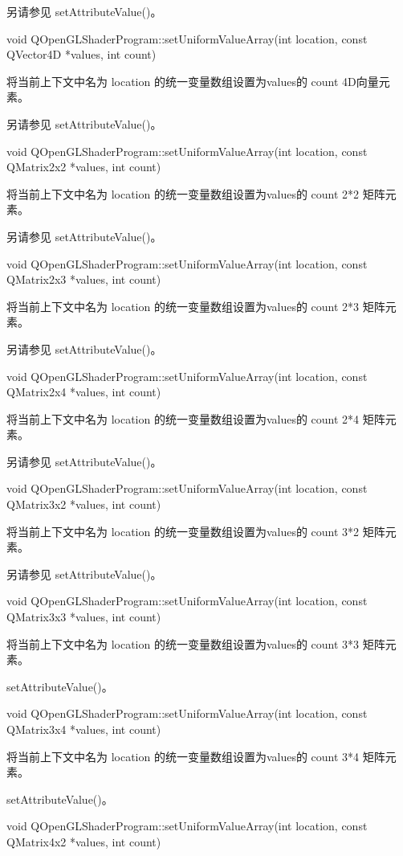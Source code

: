 另请参见 setAttributeValue()。

void QOpenGLShaderProgram::setUniformValueArray(int location, const QVector4D *values, int count)

将当前上下文中名为 location 的统一变量数组设置为values的 count 4D向量元素。

另请参见 setAttributeValue()。

void QOpenGLShaderProgram::setUniformValueArray(int location, const QMatrix2x2 *values, int count)

将当前上下文中名为 location 的统一变量数组设置为values的 count 2*2 矩阵元素。

另请参见 setAttributeValue()。

void QOpenGLShaderProgram::setUniformValueArray(int location, const QMatrix2x3 *values, int count)

将当前上下文中名为 location 的统一变量数组设置为values的 count 2*3 矩阵元素。

另请参见 setAttributeValue()。

void QOpenGLShaderProgram::setUniformValueArray(int location, const QMatrix2x4 *values, int count)

将当前上下文中名为 location 的统一变量数组设置为values的 count 2*4 矩阵元素。

另请参见 setAttributeValue()。

void QOpenGLShaderProgram::setUniformValueArray(int location, const QMatrix3x2 *values, int count)

将当前上下文中名为 location 的统一变量数组设置为values的 count 3*2 矩阵元素。

另请参见 setAttributeValue()。

void QOpenGLShaderProgram::setUniformValueArray(int location, const QMatrix3x3 *values, int count)

将当前上下文中名为 location 的统一变量数组设置为values的 count 3*3 矩阵元素。

\begin{seeAlso}
setAttributeValue()。
\end{seeAlso}

void QOpenGLShaderProgram::setUniformValueArray(int location, const QMatrix3x4 *values, int count)

将当前上下文中名为 location 的统一变量数组设置为values的 count 3*4 矩阵元素。


\begin{seeAlso}
setAttributeValue()。
\end{seeAlso}

void QOpenGLShaderProgram::setUniformValueArray(int location, const QMatrix4x2 *values, int count)

